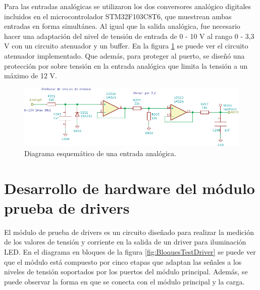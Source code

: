 Para las entradas analógicas se utilizaron los dos conversores analógico digitales incluidos en el microcontrolador STM32F103C8T6, que muestrean ambas entradas en forma simultánea. Al igual que la salida analógica, fue necesario hacer una adaptación del nivel de tensión de entrada de 0 - 10 V al rango 0 - 3,3 V con un circuito atenuador y un buffer. En la figura \ref{fig:EntradaAnalogica} se puede ver el circuito atenuador implementado. Que además, para proteger al puerto, se diseñó una protección por sobre tensión en la entrada analógica que limita la tensión a un máximo de 12 V.

\begin{figure}[H]
	\centering
	\includegraphics[width=1\textwidth]{./Figures/EntradaAnalogica.pdf}
	\caption{Diagrama esquemático de una entrada analógica.}
	\label{fig:EntradaAnalogica}
\end{figure}




\section{Desarrollo de hardware del módulo prueba de drivers}

El módulo de prueba de drivers es un circuito diseñado para realizar la medición de los valores de tensión y corriente en la salida de un driver para iluminación LED. En el diagrama en bloques de la figura \ref{fig:BloquesTestDriver} se puede ver que el módulo está compuesto por cinco etapas que adaptan las señales a los niveles de tensión soportados por los puertos del módulo principal. Además, se puede observar la forma en que se conecta con el módulo principal y la carga.

